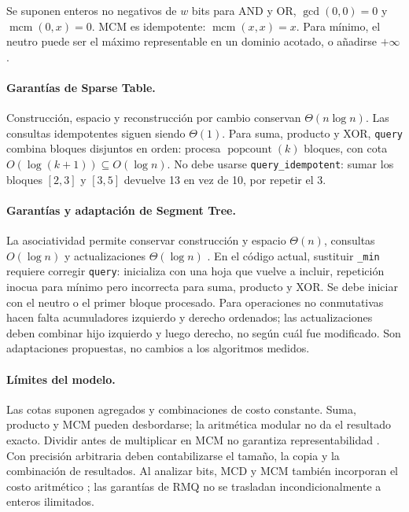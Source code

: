 Se suponen enteros no negativos de \(w\) bits para AND y OR,
\(\gcd(0,0)=0\) y \(\operatorname{mcm}(0,x)=0\). MCM es idempotente:
\(\operatorname{mcm}(x,x)=x\). Para mínimo, el neutro puede ser el máximo
representable en un dominio acotado, o añadirse \(+\infty\).

\paragraph{Garantías de Sparse Table.}
Construcción, espacio y reconstrucción por cambio conservan
\(\Theta(n\log n)\). Las consultas idempotentes siguen siendo
\(\Theta(1)\). Para suma, producto y XOR, \texttt{query} combina bloques
disjuntos en orden: procesa \(\operatorname{popcount}(k)\) bloques,
con cota \(O(\log(k+1))\subseteq O(\log n)\).
No debe usarse \texttt{query\_idempotent}: sumar los bloques
\([2,3]\) y \([3,5]\) devuelve 13 en vez de 10, por repetir el 3.

\paragraph{Garantías y adaptación de Segment Tree.}
La asociatividad permite conservar construcción y espacio \(\Theta(n)\),
consultas \(O(\log n)\) y actualizaciones \(\Theta(\log n)\)
\cite{cp-segment-tree,atcoder-segtree}. En el código actual, sustituir
\texttt{\_min} requiere corregir \texttt{query}: inicializa con una hoja
que vuelve a incluir, repetición inocua para mínimo pero incorrecta para
suma, producto y XOR. Se debe iniciar con el neutro o el primer bloque
procesado. Para operaciones no conmutativas hacen falta acumuladores
izquierdo y derecho ordenados; las actualizaciones deben combinar hijo
izquierdo y luego derecho, no según cuál fue modificado. Son adaptaciones
propuestas, no cambios a los algoritmos medidos.

\paragraph{Límites del modelo.}
Las cotas suponen agregados y combinaciones de costo constante. Suma,
producto y MCM pueden desbordarse; la aritmética modular no da el resultado
exacto. Dividir antes de multiplicar en MCM no garantiza representabilidad
\cite{cpp-lcm}. Con precisión arbitraria deben contabilizarse el tamaño,
la copia y la combinación de resultados. Al analizar bits, MCD y MCM
también incorporan el costo aritmético \cite{cp-euclid}; las garantías
de RMQ no se trasladan incondicionalmente a enteros ilimitados.

